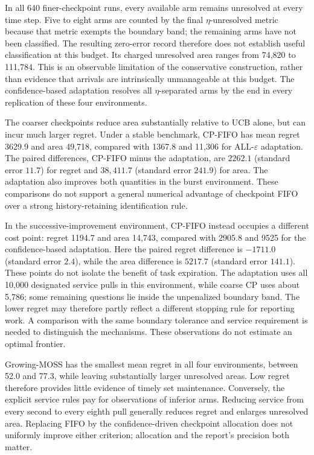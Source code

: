 \documentclass[11pt]{article}
\begin{document}
In all 640 finer-checkpoint runs, every available arm remains unresolved
at every time step. Five to eight arms are counted by the final
$\eta$-unresolved metric because that metric exempts the boundary band;
the remaining arms have not been classified. The resulting zero-error
record therefore does not establish useful classification at this budget.
Its charged unresolved area ranges from 74,820 to 111,784.
This is an observable limitation of the conservative construction, rather
than evidence that arrivals are intrinsically unmanageable at this budget.
The confidence-based adaptation resolves all $\eta$-separated arms by the
end in every replication of these four environments.

The coarser checkpoints reduce area substantially relative to UCB alone,
but can incur much larger regret. Under a stable benchmark, CP-FIFO has
mean regret 3629.9 and area 49,718, compared with 1367.8 and 11,306 for
ALL-$\varepsilon$ adaptation. The paired differences, CP-FIFO minus the
adaptation, are $2262.1$ (standard error $11.7$) for regret and $38{,}411.7$
(standard error $241.9$) for area. The adaptation also improves both
quantities in the burst environment. These comparisons do not support a
general numerical advantage of checkpoint FIFO over a strong
history-retaining identification rule.

In the successive-improvement environment, CP-FIFO instead occupies a
different cost point: regret 1194.7 and area 14,743, compared with 2905.8
and 9525 for the confidence-based adaptation. Here the paired regret
difference is $-1711.0$ (standard error $2.4$), while the area difference is
$5217.7$ (standard error $141.1$). These points do not isolate the benefit of task expiration. The adaptation
uses all 10,000 designated service pulls in this environment, while
coarse CP uses about 5,786; some remaining questions lie inside the
unpenalized boundary band. The lower regret may therefore partly reflect
a different stopping rule for reporting work. A comparison with the same
boundary tolerance and service requirement is needed to distinguish the
mechanisms. These observations do not estimate an optimal frontier.

Growing-MOSS has the smallest mean regret in all four environments,
between 52.0 and 77.3, while leaving substantially larger unresolved areas.
Low regret therefore provides little evidence of timely set maintenance.
Conversely, the explicit service rules pay for observations of inferior
arms. Reducing service from every second to every eighth pull generally
reduces regret and enlarges unresolved area. Replacing FIFO by the
confidence-driven checkpoint allocation does not uniformly improve either
criterion; allocation and the report's precision both matter.
\end{document}
